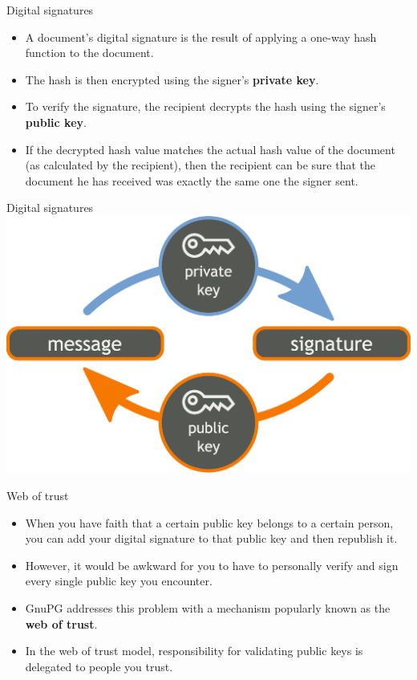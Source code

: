 \documentclass[%
mode=present,%
paper=smartboard,
size=20pt,
]{powerdot}
\begin{document}
\begin{slide}{Digital signatures}
  \begin{itemize}
  \item A document's digital signature is the result of applying a
    one-way hash function to the document.
  \item The hash is then encrypted using the signer's \textbf{private
      key}.
  \item To verify the signature, the recipient decrypts the hash using
    the signer's \textbf{public key}.
  \item If the decrypted hash value matches the actual hash value of
    the document (as calculated by the recipient), then the recipient
    can be sure that the document he has received was exactly the same
    one the signer sent.
  \end{itemize}
\end{slide}

\begin{slide}[toc=]{Digital signatures}
\centering\includegraphics[width=0.9\linewidth]{images/Orange_blue_digital_signature_en.eps}
\end{slide}

\begin{slide}{Web of trust}
  \begin{itemize}
  \item When you have faith that a certain public key belongs to a
    certain person, you can add your digital signature to that public
    key and then republish it.
  \item However, it would be awkward for you to have to personally
    verify and sign every single public key you encounter.
  \item GnuPG addresses this problem with a mechanism popularly known
    as the \textbf{web of trust}.
  \item In the web of trust model, responsibility for validating
    public keys is delegated to people you trust.
  \end{itemize}
\end{slide}
\end{document}
